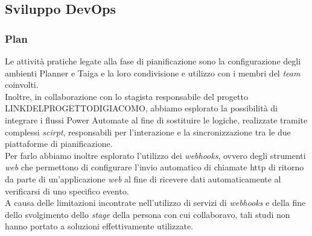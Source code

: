\subsection{Sviluppo DevOps}
\subsubsection*{Plan}
Le attività pratiche legate alla fase di pianificazione sono la configurazione degli ambienti Planner e Taiga e la loro condivisione e utilizzo con i membri del \emph{team} coinvolti.\\
Inoltre, in collaborazione con lo stagista responsabile del progetto LINKDELPROGETTODIGIACOMO, abbiamo esplorato la possibilità di integrare i flussi Power Automate al fine di sostituire le logiche, realizzate tramite complessi \emph{scirpt}, responsabili per l'interazione e la sincronizzazione tra le due piattaforme di pianificazione.\\
Per farlo abbiamo inoltre esplorato l'utilizzo dei \emph{webhooks}, ovvero degli strumenti \emph{web} che permettono di configurare l'invio automatico di chiamate \gls{http} di ritorno da parte di un'applicazione \emph{web} al fine di ricevere dati automaticamente al verificarsi di uno specifico evento.\\
A causa delle limitazioni incontrate nell'utilizzo di servizi di \emph{webhooks} e della fine dello svolgimento dello \emph{stage} della persona con cui collaboravo, tali studi non hanno portato a soluzioni effettivamente utilizzate.

